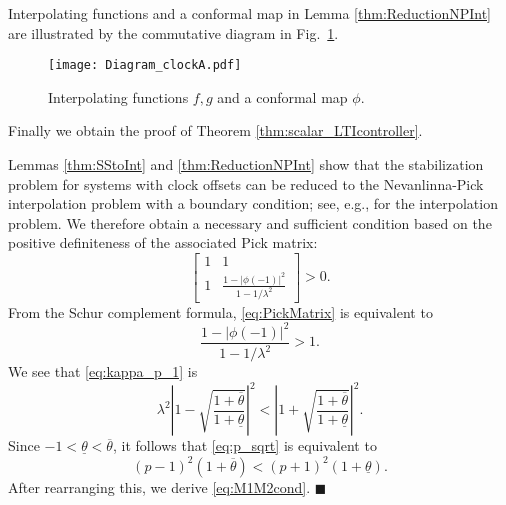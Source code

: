 \documentclass[letterpaper, 12pt, draftcls, onecolumn]{ieeeconf}
\begin{document}
Interpolating functions and a conformal map in Lemma \ref{thm:ReductionNPInt} 
are illustrated by the commutative diagram in Fig.~\ref{fig:diagram}.

\begin{figure}[tb]
	\centering
	\texttt{[image: Diagram\_clockA.pdf]}
	\caption{ Interpolating functions $f,g$ and a conformal map $\phi$.}
	\label{fig:diagram}
\end{figure}



Finally we obtain the proof of Theorem \ref{thm:scalar_LTIcontroller}.

\noindent{}
Lemmas \ref{thm:SStoInt} and \ref{thm:ReductionNPInt} show that
the stabilization problem for systems with clock offsets
can be reduced to 
the Nevanlinna-Pick interpolation problem 
with a boundary condition; see, e.g., 
\cite[Sec. 2.11]{foias1996} for the interpolation problem.
We therefore obtain a necessary and sufficient condition 
based on the positive definiteness of
the associated Pick matrix:
\begin{equation}
\label{eq:PickMatrix}
\begin{bmatrix}
1 & 1 \\
1 & \frac{1 -  | \phi(-1)|^2}{1 - 1/\lambda^2}
\end{bmatrix} > 0.
\end{equation}
From the Schur complement formula, \eqref{eq:PickMatrix} is equivalent to
\begin{equation}
\label{eq:kappa_p_1}
\frac{1 - |\phi(-1)|^2}{1 -1/\lambda^2} > 1.
\end{equation}
We see that \eqref{eq:kappa_p_1} is 
\begin{equation}
\label{eq:p_sqrt}
\lambda^2 
\left|
1 - \sqrt{ \frac{1+\overline \theta }{1+\underline \theta } }
\right|^2 < 
\left|
1 + \sqrt{ \frac{1+\overline \theta }{1+\underline \theta }}
\right|^2.
\end{equation}
Since $-1 < \underline \theta < \overline \theta$, 
it follows that \eqref{eq:p_sqrt} is equivalent to
\begin{equation}
\label{eq:1_theta}
(p-1)^2 (1+\overline \theta ) < (p+1)^2 (1+\underline \theta ).
\end{equation}
After rearranging this, we derive \eqref{eq:M1M2cond}.
\hspace*{\fill} $\blacksquare$
\end{document}
